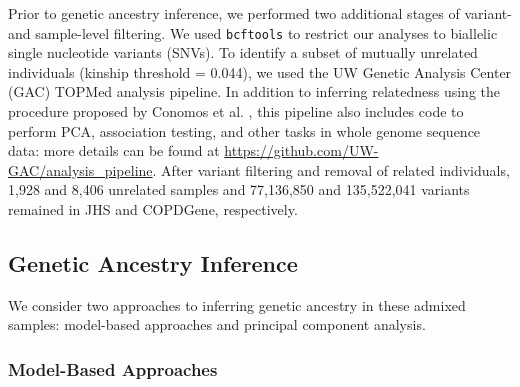 \documentclass[12pt]{article}
\begin{document}
Prior to genetic ancestry inference, we performed two additional stages of variant- and sample-level filtering.
We used \texttt{bcftools} \citep{bcftools} to restrict our analyses to biallelic single nucleotide variants (SNVs). 
To identify a subset of mutually unrelated individuals (kinship threshold = 0.044), we used the UW Genetic Analysis Center (GAC) TOPMed analysis pipeline.
In addition to inferring relatedness using the procedure proposed by Conomos et al. \cite{conomos2016related}, this pipeline also includes code to perform PCA, association testing, and other tasks in whole genome sequence data: more details can be found at \href{https://github.com/UW-GAC/analysis_pipeline}{https://github.com/UW-GAC/analysis\_pipeline}.
After variant filtering and removal of related individuals, 1,928 and 8,406 unrelated samples and 77,136,850 and 135,522,041 variants remained in JHS and COPDGene, respectively.


\subsection{Genetic Ancestry Inference}

We consider two approaches to inferring genetic ancestry in these admixed samples: model-based approaches and principal component analysis.

\subsubsection{Model-Based Approaches}
\end{document}
